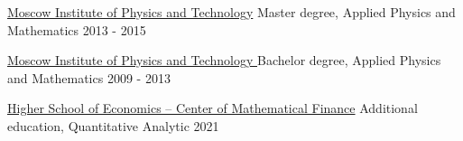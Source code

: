 \documentclass[10.5pt,a4paper]{article}
\begin{document}
\headedsection
  {\href{http://mipt.ru/}{Moscow Institute of Physics and Technology}}
  {\textsc{}}  {%
  \headedsubsection
    {Master degree, Applied Physics and Mathematics}
    {2013 - 2015}
    \smallskip
    }

\headedsection
  {\href{http://mipt.ru/}{Moscow Institute of Physics and Technology
}}
  {\textsc{}}  {%
  \headedsubsection
    {Bachelor degree, Applied Physics and Mathematics}
    {2009 - 2013}
    \smallskip
    }

\headedsection
  {\href{https://iqf.hse.ru/cmf}{Higher School of Economics – Center of Mathematical Finance}}
  {\textsc{}}  {%
  \headedsubsection
    {Additional education, Quantitative Analytic}
    {2021}
    \smallskip
    }
\end{document}

